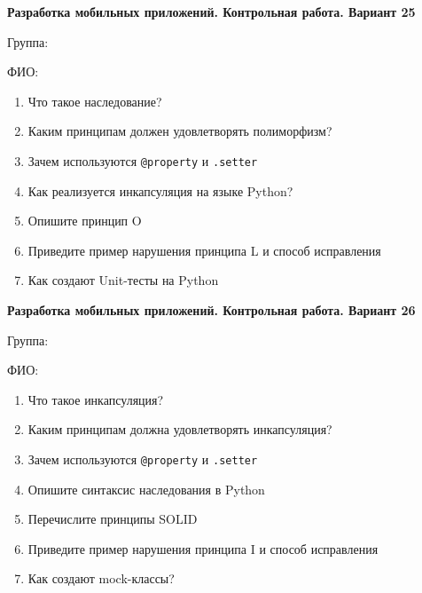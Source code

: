 \documentclass[12pt]{article}
\begin{document}
\vspace{40pt}\begin{minipage}{\textwidth}
\textbf{Разработка мобильных приложений. Контрольная работа. Вариант 25}

Группа: \underline{\hspace{3cm}}

ФИО: \underline{\hspace{10cm}}

\begin{enumerate}
\item Что такое наследование?
\item Каким принципам должен удовлетворять полиморфизм?
\item Зачем используются \verb|@property| и \verb|.setter|
\item Как реализуется инкапсуляция на языке Python?
\item Опишите принцип O
\item Приведите пример нарушения принципа L и способ исправления
\item Как создают Unit-тесты на Python

\end{enumerate}
\end{minipage}

\vspace{40pt}\begin{minipage}{\textwidth}
\textbf{Разработка мобильных приложений. Контрольная работа. Вариант 26}

Группа: \underline{\hspace{3cm}}

ФИО: \underline{\hspace{10cm}}

\begin{enumerate}
\item Что такое инкапсуляция?
\item Каким принципам должна удовлетворять инкапсуляция?
\item Зачем используются \verb|@property| и \verb|.setter|
\item Опишите синтаксис наследования в Python
\item Перечислите принципы SOLID
\item Приведите пример нарушения принципа I и способ исправления
\item Как создают mock-классы?

\end{enumerate}
\end{minipage}
\end{document}
